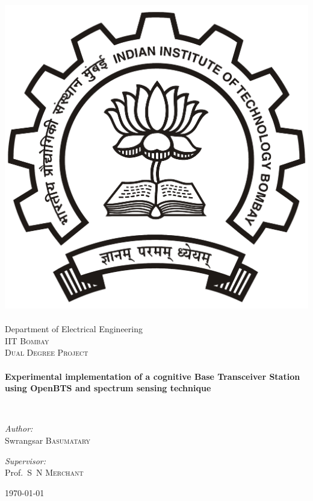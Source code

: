 \begin{titlepage}
\begin{center}

\includegraphics[width=0.23\textheight]{iitbLogo}~\\[1cm]
Department of Electrical Engineering\\[0.3cm]
\textsc{\LARGE IIT Bombay}\\[1.5cm]

\textsc{\Large Dual Degree Project}\\[0.5cm]

\HRule \\[0.4cm]
{ \huge \bfseries Experimental implementation of a cognitive Base Transceiver Station using OpenBTS and spectrum sensing technique\\[0.4cm] }

\HRule \\[1.5cm]

\begin{minipage}{0.4\textwidth}
\begin{flushleft} \large
\emph{Author:}\\
Swrangsar \textsc{Basumatary}\end{flushleft}
\end{minipage}
\begin{minipage}{0.4\textwidth}
\begin{flushright} \large
\emph{Supervisor:} \\
Prof.~S~N \textsc{Merchant}
\end{flushright}
\end{minipage}

\vfill

{\large \today}

\end{center}
\end{titlepage}

